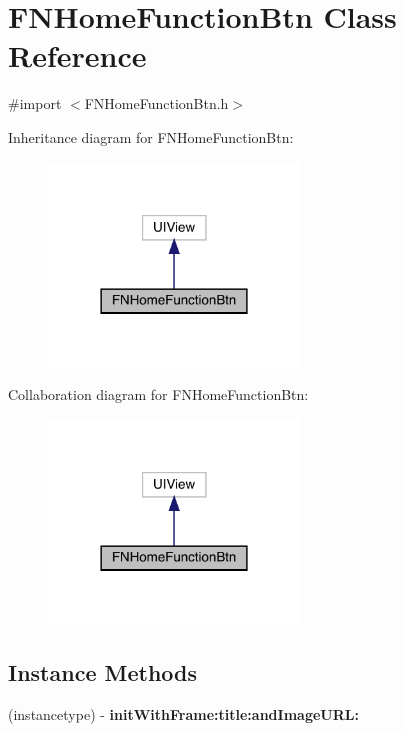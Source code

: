 \hypertarget{interface_f_n_home_function_btn}{}\section{F\+N\+Home\+Function\+Btn Class Reference}
\label{interface_f_n_home_function_btn}


{\ttfamily \#import $<$F\+N\+Home\+Function\+Btn.\+h$>$}



Inheritance diagram for F\+N\+Home\+Function\+Btn\+:\nopagebreak
\begin{figure}[H]
\begin{center}
\leavevmode
\includegraphics[width=189pt]{interface_f_n_home_function_btn__inherit__graph}
\end{center}
\end{figure}


Collaboration diagram for F\+N\+Home\+Function\+Btn\+:\nopagebreak
\begin{figure}[H]
\begin{center}
\leavevmode
\includegraphics[width=189pt]{interface_f_n_home_function_btn__coll__graph}
\end{center}
\end{figure}
\subsection*{Instance Methods}
\begin{DoxyCompactItemize}
\item 
\mbox{\label{interface_f_n_home_function_btn_af7d0c5f0acfd8b847b7c91d6cadd1858}} 
(instancetype) -\/ {\bfseries init\+With\+Frame\+:title\+:and\+Image\+U\+R\+L\+:}
\end{DoxyCompactItemize}
